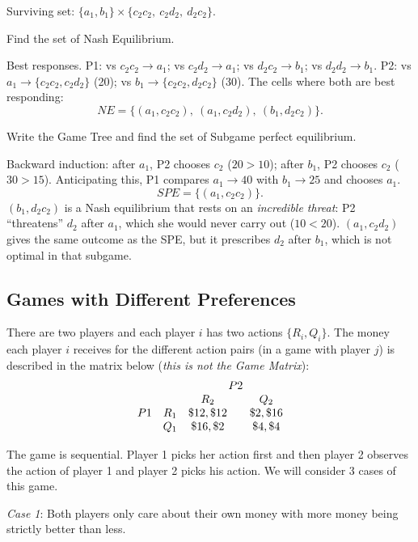 \begin{description}
\begin{solution}
Surviving set: $\{a_1,b_1\}\times\{c_2c_2,\ c_2d_2,\ d_2c_2\}$.
\end{solution}
\item[2.4] Find the set of Nash Equilibrium.
\begin{solution}
Best responses. P1: vs $c_2c_2\to a_1$; vs $c_2d_2\to a_1$; vs $d_2c_2\to b_1$; vs $d_2d_2\to b_1$. P2: vs $a_1\to\{c_2c_2,c_2d_2\}$ (20); vs $b_1\to\{c_2c_2,d_2c_2\}$ (30). The cells where both are best responding:
\[ NE=\{(a_1,c_2c_2),\ (a_1,c_2d_2),\ (b_1,d_2c_2)\}. \]
\end{solution}
\item[2.5] Write the Game Tree and find the set of Subgame perfect equilibrium.
\begin{solution}
Backward induction: after $a_1$, P2 chooses $c_2$ ($20>10$); after $b_1$, P2 chooses $c_2$ ($30>15$). Anticipating this, P1 compares $a_1\to40$ with $b_1\to25$ and chooses $a_1$.
\[ SPE=\{(a_1,c_2c_2)\}. \]
$(b_1,d_2c_2)$ is a Nash equilibrium that rests on an \emph{incredible threat}: P2 ``threatens'' $d_2$ after $a_1$, which she would never carry out ($10<20$). $(a_1,c_2d_2)$ gives the same outcome as the SPE, but it prescribes $d_2$ after $b_1$, which is not optimal in that subgame.
\end{solution}
\end{description}

\subsection{Games with Different Preferences}

\noindent There are two players and each player $i$ has two actions $\{R_i,Q_i\}$. The money each player $i$ receives for the different action pairs (in a game with player $j$) is described in the matrix below (\emph{this is not the Game Matrix}):
\[
\begin{array}{ccc@{\qquad}c}
 & & \multicolumn{2}{c}{P2}\\
 & & R_2 & Q_2\\
P1 & R_1 & \$12,\$12 & \$2,\$16\\
 & Q_1 & \$16,\$2 & \$4,\$4
\end{array}
\]

The game is sequential. Player 1 picks her action first and then player 2 observes the action of player 1 and player 2 picks his action. We will consider 3 cases of this game.

\emph{Case 1}: Both players only care about their own money with more money being strictly better than less.

